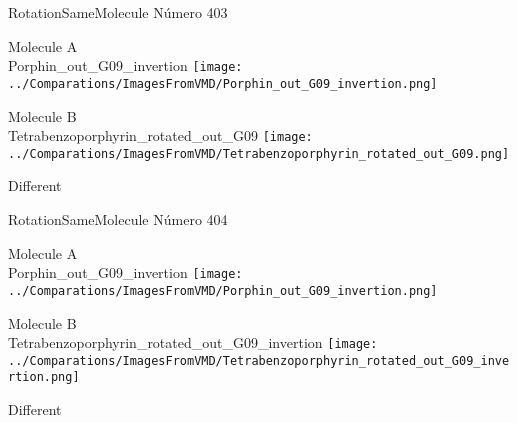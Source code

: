 \vtab[-2cm]
\begin{center}
{\large RotationSameMolecule \tab Número 403}
\end{center}
\begin{multicols}{2}
\begin{center}
Molecule A \\ 
Porphin\_out\_G09\_invertion
\texttt{[image: ../Comparations/ImagesFromVMD/Porphin\_out\_G09\_invertion.png]}
\\
\vtab

\columnbreak
Molecule B \\ 
Tetrabenzoporphyrin\_rotated\_out\_G09
\texttt{[image: ../Comparations/ImagesFromVMD/Tetrabenzoporphyrin\_rotated\_out\_G09.png]}
\\
\vtab


\end{center}
\end{multicols}
\begin{center}
\vtab
\vtab
\textcolor{NavyBlue}{\Large Different}
\end{center}

 \newpage

\vtab[-2cm]
\begin{center}
{\large RotationSameMolecule \tab Número 404}
\end{center}
\begin{multicols}{2}
\begin{center}
Molecule A \\ 
Porphin\_out\_G09\_invertion
\texttt{[image: ../Comparations/ImagesFromVMD/Porphin\_out\_G09\_invertion.png]}
\\
\vtab

\columnbreak
Molecule B \\ 
Tetrabenzoporphyrin\_rotated\_out\_G09\_invertion
\texttt{[image: ../Comparations/ImagesFromVMD/Tetrabenzoporphyrin\_rotated\_out\_G09\_invertion.png]}
\\
\vtab


\end{center}
\end{multicols}
\begin{center}
\vtab
\vtab
\textcolor{NavyBlue}{\Large Different}
\end{center}

 \newpage

